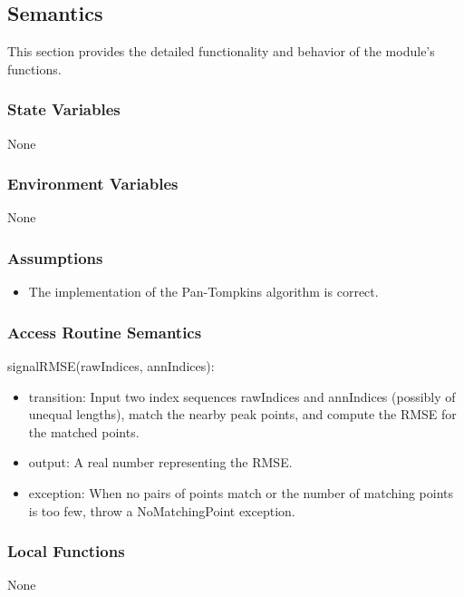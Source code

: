 \documentclass[12pt, titlepage]{article}
\begin{document}
\subsection{Semantics}

This section provides the detailed functionality and behavior of the module’s
functions.

\subsubsection{State Variables}

None

\subsubsection{Environment Variables}

None

\subsubsection{Assumptions}

\begin{itemize}
\item The implementation of the Pan-Tompkins algorithm is correct.
\end{itemize}

\subsubsection{Access Routine Semantics}

\noindent signalRMSE(rawIndices, annIndices):
\begin{itemize}
\item transition: Input two index sequences rawIndices and annIndices (possibly
of unequal lengths), match the nearby peak points, and compute the RMSE for the
matched points.
\item output: A real number representing the RMSE.
\item exception: When no pairs of points match or the number of matching points
is too few, throw a NoMatchingPoint exception.
\end{itemize}

\subsubsection{Local Functions}

None

\newpage
\end{document}
